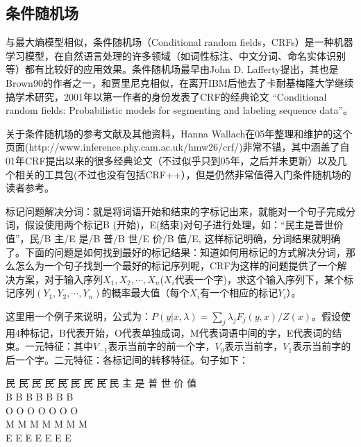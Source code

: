 \subsection{条件随机场}
\par 与最大熵模型相似，条件随机场（Conditional random fields，CRFs）是一种机器学习模型，在自然语言处理的许多领域（如词性标注、中文分词、命名实体识别等）都有比较好的应用效果。条件随机场最早由John D. Lafferty提出，其也是Brown90的作者之一，和贾里尼克相似，在离开IBM后他去了卡耐基梅隆大学继续搞学术研究，2001年以第一作者的身份发表了CRF的经典论文 “Conditional random fields: Probabilistic models for segmenting and labeling sequence data”。
\par 关于条件随机场的参考文献及其他资料，Hanna Wallach在05年整理和维护的这个页面(http://www.inference.phy.cam.ac.uk/hmw26/crf/)非常不错，其中涵盖了自01年CRF提出以来的很多经典论文（不过似乎只到05年，之后并未更新）以及几个相关的工具包(不过也没有包括CRF++），但是仍然非常值得入门条件随机场的读者参考。
\par 标记问题解决分词：就是将词语开始和结束的字标记出来，就能对一个句子完成分词，假设使用两个标记B (开始)，E(结束)对句子进行处理，如：“民主是普世价值”，民/B 主/E 是/B 普/B 世/E 价/B 值/E, 这样标记明确，分词结果就明确了。下面的问题是如何找到最好的标记结果：知道如何用标记的方式解决分词，那么怎么为一个句子找到一个最好的标记序列呢，CRF为这样的问题提供了一个解决方案，对于输入序列$X_1,X_2,\cdots,X_n$($X_i$代表一个字)，求这个输入序列下，某个标记序列$(Y_1,Y_2,\cdots,Y_n)$的概率最大值（每个$X_i$有一个相应的标记$Y_i$）。
\par 这里用一个例子来说明，公式为：$P(y|x,\lambda)=\sum _j \lambda_jF_j(y,x)/Z(x)$。假设使用4种标记，B代表开始，O代表单独成词，M代表词语中间的字，E代表词的结束。一元特征：其中$V_{-1}$表示当前字的前一个字，$V_0$表示当前字，$V_1$表示当前字的后一个字。二元特征：各标记间的转移特征。句子如下：
{\color{red}
\begin{tabbing}
民\hspace*{20bp} \=民\hspace*{20bp} \=民\hspace*{20bp} \=民\hspace*{20bp} \=民\hspace*{20bp} \=民\hspace*{20bp} \=民\hspace*{20bp} \=民\kill
民 \>主 \>是 \>普 \>世 \>价 \>值\\
B \>B \>B \>B \>B \>B \>B\\
O  \>O   \>O   \>O   \>O   \>O   \>O\\
M  \>M   \>M   \>M   \>M   \>M   \>M\\
E   \>E   \>E   \>E   \>E   \>E   \>E\\
\end{tabbing}}
